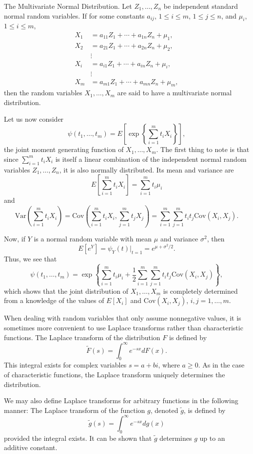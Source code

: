 \documentclass[lang=cn,10pt,thmcnt=section]{elegantbook}
\begin{document}
\begin{example}
	The Multivariate Normal Distribution. Let \(Z_1, \ldots, Z_n\) be independent standard normal random variables. If for some constants \(a_{ij}\), \(1 \leq i \leq m\), \(1 \leq j \leq n\), and \(\mu_i\), \(1 \leq i \leq m\),
\begin{align*}
X_1 &= a_{11} Z_1 + \cdots + a_{1n} Z_n + \mu_1, \\
X_2 &= a_{21} Z_1 + \cdots + a_{2n} Z_n + \mu_2, \\
&\vdots \\
X_i &= a_{i1} Z_1 + \cdots + a_{in} Z_n + \mu_i, \\
&\vdots \\
X_m &= a_{m1} Z_1 + \cdots + a_{mn} Z_n + \mu_m,
\end{align*}
then the random variables \(X_1, \ldots, X_m\) are said to have a multivariate normal distribution.

Let us now consider
\[
\psi(t_1, \ldots, t_m) = E\left[\exp\left\{\sum_{i=1}^m t_i X_i\right\}\right],
\]
the joint moment generating function of \(X_1, \ldots, X_m\). The first thing to note is that since \(\sum_{i=1}^m t_i X_i\) is itself a linear combination of the independent normal random variables \(Z_1, \ldots, Z_n\), it is also normally distributed. Its mean and variance are
\[
E\left[\sum_{i=1}^m t_i X_i\right] = \sum_{i=1}^m t_i \mu_i
\]
and
\[
\text{Var}\left(\sum_{i=1}^m t_i X_i\right) = \text{Cov}\left(\sum_{i=1}^m t_i X_i, \sum_{j=1}^m t_j X_j\right) = \sum_{i=1}^m \sum_{j=1}^m t_i t_j \text{Cov}(X_i, X_j).
\]

Now, if \(Y\) is a normal random variable with mean \(\mu\) and variance \(\sigma^2\), then
\[
E[e^{Y}] = \psi_Y(t)|_{t=1} = e^{\mu + \sigma^2/2}.
\]
Thus, we see that
\[
\psi(t_1, \ldots, t_m) = \exp\left\{\sum_{i=1}^m t_i \mu_i + \frac{1}{2} \sum_{i=1}^m \sum_{j=1}^m t_i t_j \text{Cov}(X_i, X_j)\right\},
\]
which shows that the joint distribution of \(X_1, \ldots, X_m\) is completely determined from a knowledge of the values of \(E[X_i]\) and \(\text{Cov}(X_i, X_j)\), \(i, j = 1, \ldots, m\).

When dealing with random variables that only assume nonnegative values, it is sometimes more convenient to use Laplace transforms rather than characteristic functions. The Laplace transform of the distribution \(F\) is defined by
\[
\tilde{F}(s) = \int_0^\infty e^{-sx} dF(x).
\]
This integral exists for complex variables \(s = a + bi\), where \(a \geq 0\). As in the case of characteristic functions, the Laplace transform uniquely determines the distribution.

We may also define Laplace transforms for arbitrary functions in the following manner: The Laplace transform of the function \(g\), denoted \(\tilde{g}\), is defined by
\[
\tilde{g}(s) = \int_0^\infty e^{-sx} dg(x)
\]
provided the integral exists. It can be shown that \(\tilde{g}\) determines \(g\) up to an additive constant.
\end{example}
\end{document}
